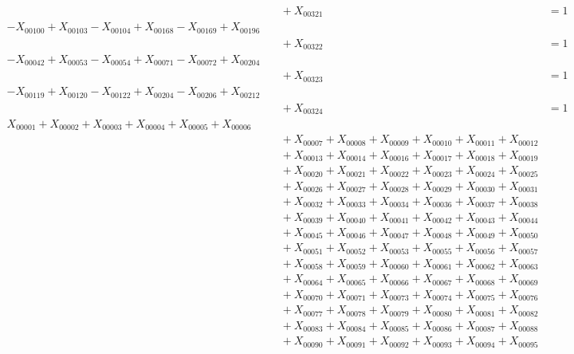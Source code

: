 \documentclass[a4paper,10pt]{article}
\begin{document}
{\begin{align}
&\quad  + X_{00321} &= 1 && \text{(R00090)} \\
-X_{00100} + X_{00103} - X_{00104} + X_{00168} - X_{00169} + X_{00196} \\[0.5ex]
&\quad  + X_{00322} &= 1 && \text{(R00091)} \\
-X_{00042} + X_{00053} - X_{00054} + X_{00071} - X_{00072} + X_{00204} \\[0.5ex]
&\quad  + X_{00323} &= 1 && \text{(R00092)} \\
-X_{00119} + X_{00120} - X_{00122} + X_{00204} - X_{00206} + X_{00212} \\[0.5ex]
&\quad  + X_{00324} &= 1 && \text{(R00093)} \\
X_{00001} + X_{00002} + X_{00003} + X_{00004} + X_{00005} + X_{00006} \\[0.5ex]
&\quad  + X_{00007} + X_{00008} + X_{00009} + X_{00010} + X_{00011} + X_{00012} \\[0.5ex]
&\quad  + X_{00013} + X_{00014} + X_{00016} + X_{00017} + X_{00018} + X_{00019} \\[0.5ex]
&\quad  + X_{00020} + X_{00021} + X_{00022} + X_{00023} + X_{00024} + X_{00025} \\[0.5ex]
&\quad  + X_{00026} + X_{00027} + X_{00028} + X_{00029} + X_{00030} + X_{00031} \\[0.5ex]
&\quad  + X_{00032} + X_{00033} + X_{00034} + X_{00036} + X_{00037} + X_{00038} \\[0.5ex]
&\quad  + X_{00039} + X_{00040} + X_{00041} + X_{00042} + X_{00043} + X_{00044} \\[0.5ex]
&\quad  + X_{00045} + X_{00046} + X_{00047} + X_{00048} + X_{00049} + X_{00050} \\[0.5ex]
&\quad  + X_{00051} + X_{00052} + X_{00053} + X_{00055} + X_{00056} + X_{00057} \\[0.5ex]
&\quad  + X_{00058} + X_{00059} + X_{00060} + X_{00061} + X_{00062} + X_{00063} \\[0.5ex]
&\quad  + X_{00064} + X_{00065} + X_{00066} + X_{00067} + X_{00068} + X_{00069} \\[0.5ex]
&\quad  + X_{00070} + X_{00071} + X_{00073} + X_{00074} + X_{00075} + X_{00076} \\[0.5ex]
&\quad  + X_{00077} + X_{00078} + X_{00079} + X_{00080} + X_{00081} + X_{00082} \\[0.5ex]
&\quad  + X_{00083} + X_{00084} + X_{00085} + X_{00086} + X_{00087} + X_{00088} \\[0.5ex]
&\quad  + X_{00090} + X_{00091} + X_{00092} + X_{00093} + X_{00094} + X_{00095} \\[0.5ex]

\end{align}}
\end{document}
